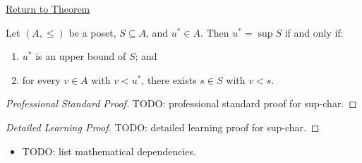 \newpage
{}
\label{prf:sup-char}

\begin{remark*}[Return]
\hyperref[prop:sup-char]{Return to Theorem}
\end{remark*}

\begin{theorem*}
Let $(A, \leq)$ be a poset, $S \subseteq A$, and $u^* \in A$.  Then
$u^* = \sup S$ if and only if:
\begin{enumerate}[label=(\roman*)]
  \item $u^*$ is an upper bound of $S$; and
  \item for every $v \in A$ with $v < u^*$, there exists $s \in S$ with
        $v < s$.
\end{enumerate}
\end{theorem*}

\begin{proof}[Professional Standard Proof]
\LRAProofBodyStart
TODO: professional standard proof for sup-char.
\end{proof}

\begin{proof}[Detailed Learning Proof]
\LRAProofBodyStart
TODO: detailed learning proof for sup-char.
\end{proof}

\begin{remark*}
\end{remark*}

\begin{dependencies}
\begin{itemize}
  \item TODO: list mathematical dependencies.
\end{itemize}
\end{dependencies}

\clearpage
